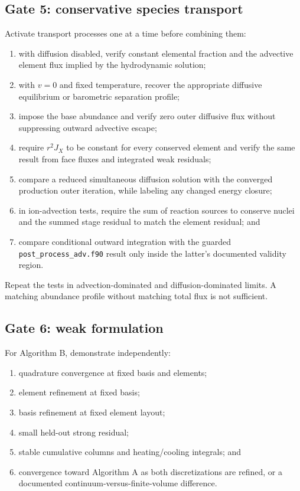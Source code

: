 \documentclass[english,a4paper]{my_memo}
\newcommand{\code}[1]{\texttt{#1}}
\begin{document}
\subsection{Gate 5: conservative species transport}

Activate transport processes one at a time before combining them:
\begin{enumerate}
\item with diffusion disabled, verify constant elemental fraction and the
  advective element flux implied by the hydrodynamic solution;
\item with \(v=0\) and fixed temperature, recover the appropriate diffusive
  equilibrium or barometric separation profile;
\item impose the base abundance and verify zero outer diffusive flux without
  suppressing outward advective escape;
\item require \(r^2J_X\) to be constant for every conserved element and verify
  the same result from face fluxes and integrated weak residuals;
\item compare a reduced simultaneous diffusion solution with the converged
  production outer iteration, while labeling any changed energy closure;
\item in ion-advection tests, require the sum of reaction sources to conserve
  nuclei and the summed stage residual to match the element residual; and
\item compare conditional outward integration with the guarded
  \code{post\_process\_adv.f90} result only inside the latter's documented
  validity region.
\end{enumerate}
Repeat the tests in advection-dominated and diffusion-dominated limits.  A
matching abundance profile without matching total flux is not sufficient.

\subsection{Gate 6: weak formulation}

For Algorithm B, demonstrate independently:
\begin{enumerate}
\item quadrature convergence at fixed basis and elements;
\item element refinement at fixed basis;
\item basis refinement at fixed element layout;
\item small held-out strong residual;
\item stable cumulative columns and heating/cooling integrals; and
\item convergence toward Algorithm A as both discretizations are refined, or a
  documented continuum-versus-finite-volume difference.
\end{enumerate}
\end{document}
